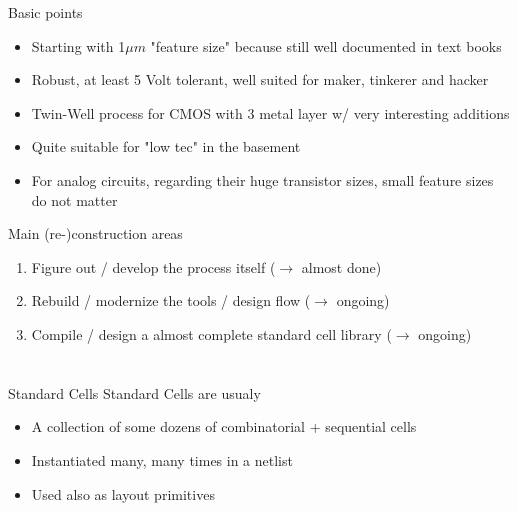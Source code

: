 \documentclass[aspectratio=169]{beamer}
\begin{document}
\begin{frame}{Basic points}
	\begin{itemize}
        \setlength\itemsep{1em}
		\item Starting with 1$\mu m$ "feature size" because still well documented in text books
		\item Robust, at least 5 Volt tolerant, well suited for maker, tinkerer and hacker
		\item Twin-Well process for CMOS with 3 metal layer w/ very interesting additions
		\item Quite suitable for "low tec" in the basement
		\item For analog circuits, regarding their huge transistor sizes, small feature sizes do not matter
	\end{itemize}
\end{frame}

\begin{frame}{Main (re-)construction areas}
	\begin{enumerate}
		\item Figure out / develop the process itself ($\rightarrow$ almost done)
		\item Rebuild / modernize the tools / design flow ($\rightarrow$ ongoing)
		\item Compile / design a almost complete standard cell library ($\rightarrow$ ongoing)
	\end{enumerate}
\end{frame}

\section[Standard cells]{}
\begin{frame}{Standard Cells}
Standard Cells are usualy
	\begin{itemize}
        \setlength\itemsep{1em}
		\item A collection of some dozens of combinatorial + sequential cells
		\item Instantiated many, many times in a netlist
		\item Used also as layout primitives
	\end{itemize}
\end{frame}
\end{document}
